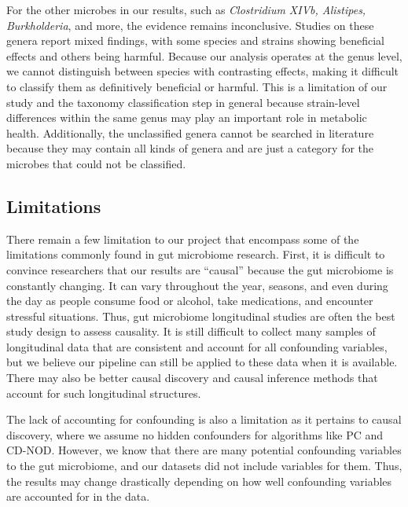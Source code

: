 \documentclass[12pt,letterpaper]{article}
\begin{document}
For the other microbes in our results, such as \textit{Clostridium XIVb, Alistipes, Burkholderia}, and more, the evidence remains inconclusive. Studies on these genera report mixed findings, with some species and strains showing beneficial effects and others being harmful. Because our analysis operates at the genus level, we cannot distinguish between species with contrasting effects, making it difficult to classify them as definitively beneficial or harmful. This is a limitation of our study and the taxonomy classification step in general because strain-level differences within the same genus may play an important role in metabolic health. Additionally, the unclassified genera cannot be searched in literature because they may contain all kinds of genera and are just a category for the microbes that could not be classified. 

\subsection{Limitations}

There remain a few limitation to our project that encompass some of the limitations commonly found in gut microbiome research. First, it is difficult to convince researchers that our results are “causal” because the gut microbiome is constantly changing. It can vary throughout the year, seasons, and even during the day as people consume food or alcohol, take medications, and encounter stressful situations. Thus, gut microbiome longitudinal studies are often the best study design to assess causality. It is still difficult to collect many samples of longitudinal data that are consistent and account for all confounding variables, but we believe our pipeline can still be applied to these data when it is available. There may also be better causal discovery and causal inference methods that account for such longitudinal structures. 

The lack of accounting for confounding is also a limitation as it pertains to causal discovery, where we assume no hidden confounders for algorithms like PC and CD-NOD. However, we know that there are many potential confounding variables to the gut microbiome, and our datasets did not include variables for them. Thus, the results may change drastically depending on how well confounding variables are accounted for in the data. 
\end{document}

